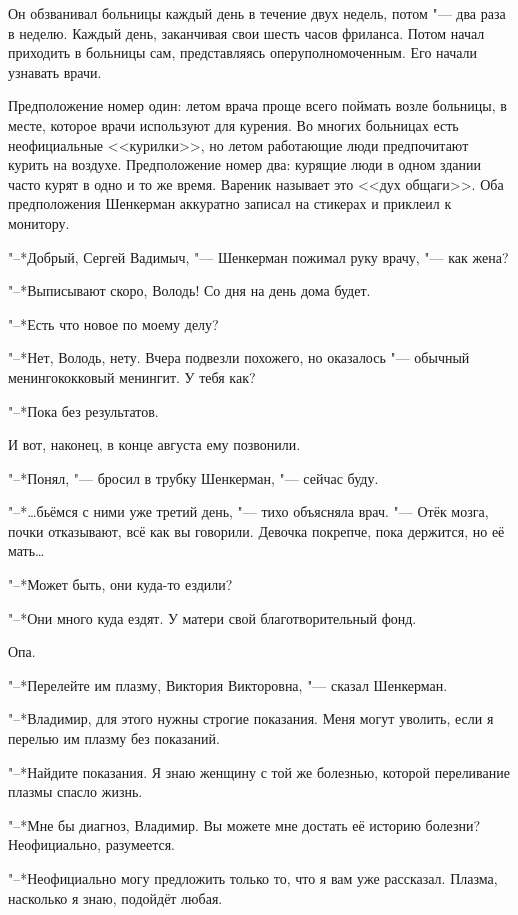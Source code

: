 Он обзванивал больницы каждый день в течение двух недель, потом "--- два раза в неделю.
Каждый день, заканчивая свои шесть часов фриланса.
Потом начал приходить в больницы сам, представляясь оперуполномоченным.
Его начали узнавать врачи.

Предположение номер один: летом врача проще всего поймать возле больницы, в месте, которое врачи используют для курения.
Во многих больницах есть неофициальные <<курилки>>, но летом работающие люди предпочитают курить на воздухе.
Предположение номер два: курящие люди в одном здании часто курят в одно и то же время.
Вареник называет это <<дух общаги>>.
Оба предположения Шенкерман аккуратно записал на стикерах и приклеил к монитору.

"--*Добрый, Сергей Вадимыч, "--- Шенкерман пожимал руку врачу, "--- как жена?

"--*Выписывают скоро, Володь!
Со дня на день дома будет.

"--*Есть что новое по моему делу?

"--*Нет, Володь, нету.
Вчера подвезли похожего, но оказалось "--- обычный менингококковый менингит.
У тебя как?

"--*Пока без результатов.

И вот, наконец, в конце августа ему позвонили.

\label{Fri_2012_08_24}

"--*Понял, "--- бросил в трубку Шенкерман, "--- сейчас буду.

"--*\ldots{}бьёмся с ними уже третий день, "--- тихо объясняла врач.
"--- Отёк мозга, почки отказывают, всё как вы говорили.
Девочка покрепче, пока держится, но её мать\ldots{}

"--*Может быть, они куда-то ездили?

"--*Они много куда ездят.
У матери свой благотворительный фонд.

Опа.

"--*Перелейте им плазму, Виктория Викторовна, "--- сказал Шенкерман.

"--*Владимир, для этого нужны строгие показания.
Меня могут уволить, если я перелью им плазму без показаний.

"--*Найдите показания.
Я знаю женщину с той же болезнью, которой переливание плазмы спасло жизнь.

"--*Мне бы диагноз, Владимир.
Вы можете мне достать её историю болезни?
Неофициально, разумеется.

"--*Неофициально могу предложить только то, что я вам уже рассказал.
Плазма, насколько я знаю, подойдёт любая.

